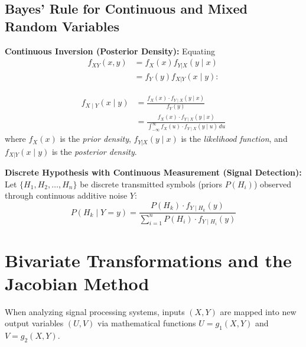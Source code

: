 \documentclass[12pt,a4paper]{article}
\begin{document}
\subsection{Bayes' Rule for Continuous and Mixed Random Variables}
\begin{tcolorbox}[formulabox, title={\textbf{Continuous and Mixed Formulations of Bayes' Rule}}]
\textbf{Continuous Inversion (Posterior Density):}
Equating
  \[
    \begin{aligned}
      f_{XY}(x, y) &= f_X(x) f_{Y|X}(y \mid x) \\[3pt]
      &= f_Y(y) f_{X|Y}(x \mid y):
    \end{aligned}
  \]

\begin{equation}
  \begin{aligned}
    f_{X \mid Y}(x \mid y) &= \frac{f_X(x) \cdot f_{Y \mid X}(y \mid x)}{f_Y(y)} \\[3pt]
    &= \frac{f_X(x) \cdot f_{Y \mid X}(y \mid x)}{\displaystyle\int_{-\infty}^\infty f_X(u) \cdot f_{Y \mid X}(y \mid u) \, du}
  \end{aligned}
\end{equation}
where $f_X(x)$ is the \textit{prior density}, $f_{Y|X}(y \mid x)$ is the \textit{likelihood function}, and $f_{X|Y}(x \mid y)$ is the \textit{posterior density}.

\textbf{Discrete Hypothesis with Continuous Measurement (Signal Detection):}
Let $\{H_1, H_2, \dots, H_n\}$ be discrete transmitted symbols (priors $P(H_i)$) observed through continuous additive noise $Y$:
\begin{equation}
  P(H_k \mid Y = y) = \frac{P(H_k) \cdot f_{Y \mid H_k}(y)}{\displaystyle\sum_{i=1}^n P(H_i) \cdot f_{Y \mid H_i}(y)}
\end{equation}
\end{tcolorbox}

\section{Bivariate Transformations and the Jacobian Method}

When analyzing signal processing systems, inputs $(X, Y)$ are mapped into new output variables $(U, V)$ via mathematical functions $U = g_1(X, Y)$ and $V = g_2(X, Y)$.
\end{document}
